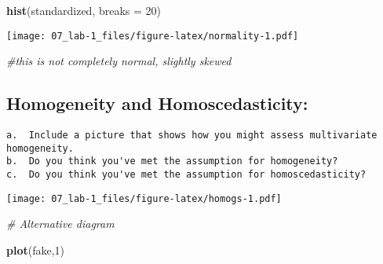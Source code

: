\documentclass[
]{article}
\newenvironment{Shaded}{\begin{snugshade}}{\end{snugshade}}
\newcommand{\CommentTok}[1]{\textcolor[rgb]{0.56,0.35,0.01}{\textit{#1}}}
\newcommand{\DataTypeTok}[1]{\textcolor[rgb]{0.13,0.29,0.53}{#1}}
\newcommand{\DecValTok}[1]{\textcolor[rgb]{0.00,0.00,0.81}{#1}}
\newcommand{\KeywordTok}[1]{\textcolor[rgb]{0.13,0.29,0.53}{\textbf{#1}}}
\newcommand{\NormalTok}[1]{#1}
\newcommand{\OperatorTok}[1]{\textcolor[rgb]{0.81,0.36,0.00}{\textbf{#1}}}
\newcommand{\StringTok}[1]{\textcolor[rgb]{0.31,0.60,0.02}{#1}}
\begin{document}
\begin{Shaded}
\begin{Highlighting}[]
\KeywordTok{hist}\NormalTok{(standardized, }\DataTypeTok{breaks =} \DecValTok{20}\NormalTok{)}
\end{Highlighting}
\end{Shaded}

\texttt{[image: 07\_lab-1\_files/figure-latex/normality-1.pdf]}

\begin{Shaded}
\begin{Highlighting}[]
\CommentTok{#this is not completely normal, slightly skewed}
\end{Highlighting}
\end{Shaded}

\hypertarget{homogeneity-and-homoscedasticity}{%
\subsection{Homogeneity and
Homoscedasticity:}\label{homogeneity-and-homoscedasticity}}

\begin{verbatim}
a.  Include a picture that shows how you might assess multivariate homogeneity.
b.  Do you think you've met the assumption for homogeneity?
c.  Do you think you've met the assumption for homoscedasticity?
\end{verbatim}

\begin{Shaded}
\end{Shaded}

\texttt{[image: 07\_lab-1\_files/figure-latex/homogs-1.pdf]}

\begin{Shaded}
\begin{Highlighting}[]
\CommentTok{# Alternative diagram}

\KeywordTok{plot}\NormalTok{(fake,}\DecValTok{1}\NormalTok{)}
\end{Highlighting}
\end{Shaded}
\end{document}
